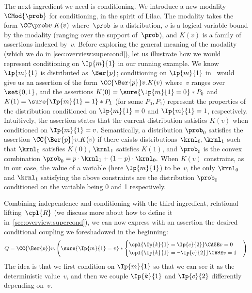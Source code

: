 \documentclass[acmsmall,nonacm,screen,appendix]{acmart}
\begin{document}
The next ingredient we need is conditioning.
We introduce a new modality $\CMod{\prob}$ for conditioning,
in the spirit of Lilac.
The modality takes the form
$
  \CC\prob v.K(v)
$
where~$\prob$ is a distribution, $v$ is a logical variable bound
by the modality (ranging over the support of~$\prob$),
and $K(v)$ is a family of assertions indexed by~$v$.
Before exploring the general meaning of the modality
(which we do in \cref{sec:overview:supercond}),
let us illustrate how we would represent conditioning on $\Ip{m}{1}$
in our running example.
We know $\Ip{m}{1}$ is distributed as~$\Ber{p}$;
conditioning on $\Ip{m}{1}$ in \thelogic\ would give us
an assertion of the form
$\CC{\Ber{p}} v. K(v)$
where~$v$ ranges over~$\set{0,1}$,
and the assertions
$K(0) = \sure{\Ip{m}{1}=0} * P_0 $
and
$K(1) = \sure{\Ip{m}{1}=1} * P_1 $
(for some $P_0,P_1$)
represent the properties of the distribution conditioned on
$ \Ip{m}{1}=0 $ and $ \Ip{m}{1}=1 $, respectively.
Intuitively, the assertion states that the current distribution
satisfies $K(v)$ when conditioned on $\Ip{m}{1}=v$.
Semantically, a distribution $\prob_0$ satisfies the assertion
$\CC{\Ber{p}} v. K(v)$
if there exists distributions $ \krnl_0, \krnl_1$ such that
$\krnl_0$ satisfies $ K(0)$,
$\krnl_1$ satisfies $ K(1)$, and
$\prob_0$ is the convex combination
$
  \prob_0 = p \cdot \krnl_1 + (1-p) \cdot \krnl_0.
$
When $K(v)$ constrains, as in our case, the value of a variable
(here $\Ip{m}{1}$) to be~$v$,
the only $\krnl_0$ and $\krnl_1$ satisfying the above constraints
are the distribution $\prob_0$ conditioned on the variable being 0 and 1 respectively.



Combining independence and conditioning with the third ingredient,
relational lifting~$\cpl{R}$ (we discuss more about how to define it
in~\cref{sec:overview:supercond}), we can now express with an assertion the desired
conditional coupling we foreshadowed in the beginning:
\begin{equation}
  Q =
  \CC{\Ber{p}} v.
    \left(
      \sure{\Ip{m}{1}=v}
      *
      \begin{cases}
        \cpl{ \Ip{k}{1} = \Ip{c}{2} }     \CASE v=0 \\
        \cpl{ \Ip{k}{1} = \neg\Ip{c}{2} } \CASE v=1
      \end{cases}
    \right)
  \label{ex:xor:ccouple}
\end{equation}
The idea is that we first condition on $\Ip{m}{1}$
so that we can see it as the deterministic value~$v$,
and then we couple $\Ip{k}{1}$ and $\Ip{c}{2}$ differently
depending on~$v$.
\end{document}

